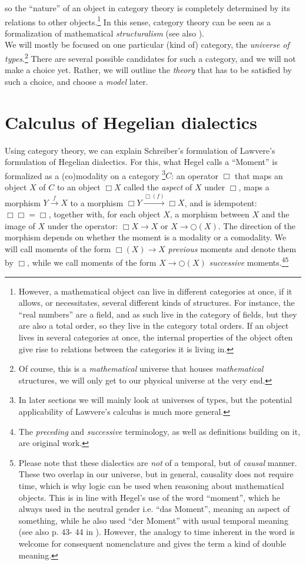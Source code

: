 \documentclass{article}
\begin{document}
so the ``nature'' of an object in category theory is completely determined by its relations to other objects.\footnote{However,
a mathematical object can live in different categories at once, if it allows, or necessitates, several
different kinds of structures. For instance, the ``real numbers'' are a field, and as such live in the
category of fields, but they are also a total order, so they live in the category total orders. If an
object lives in several categories at once, the internal properties of the object often give rise to relations
between the categories it is living in.} In this sense, category theory can be seen as a formalization
of mathematical \emph{structuralism} (see also \cite{Ad03}). \\

We will mostly be focused on one particular (kind of) category, the \emph{universe of types}.\footnote{Of
course, this is a \emph{mathematical} universe that houses \emph{mathematical} structures, we will only
get to our physical universe at the very end.} There are several possible candidates for such a category,
and we will not make a choice yet. Rather, we will outline the \emph{theory} that has to be satisfied
by such a choice, and choose a \emph{model} later.


\section{Calculus of Hegelian dialectics}
Using category theory, we can explain Schreiber's formulation of Lawvere's formulation of Hegelian dialectics.
For this, what Hegel calls a ``Moment'' is formalized as a (co)modality on a category \footnote{In later
sections we will mainly look at universes of types, but the potential applicability of Lawvere's calculus
is much more general.}$C$: an operator $\Box$ that maps an object $X$ of $C$ to an object $\Box X$ called
the \emph{aspect} of $X$ under $\Box$, maps a morphism $Y\xrightarrow{f} X$ to a morphism $\Box Y\xrightarrow{\Box(f)}\Box
X$, and is idempotent: $\Box\Box =\Box$, together with, for each object $X$, a morphism between $X$ and
the image of $X$ under the operator: $\Box X\rightarrow X$ or $X\rightarrow \bigcirc(X)$. The direction
of the morphism depends on whether the moment is a modality or a comodality. We will call moments of the
form $\Box(X)\rightarrow X$ \emph{previous} moments and denote them by $\Box$, while we call moments of
the form $X\rightarrow \bigcirc(X)$ \emph{successive} moments.\footnote{The \emph{preceding} and \emph{successive}
terminology, as well as definitions building on it, are original work.}\footnote{Please note that these
dialectics are \emph{not} of a temporal, but of \emph{causal} manner. These two overlap in our universe,
but in general, causality does not require time, which is why logic can be used when reasoning about mathematical
objects. This is in line with Hegel's use of the word  ``moment'', which he always used in the neutral
gender i.e. ``das Moment'', meaning an aspect of something, while he also used ``der Moment'' with usual
temporal meaning (see also p. 43- 44 in \cite{Kli}). However, the analogy to time inherent in the word
is welcome for consequent nomenclature and gives the term a kind of double meaning.}
\end{document}
